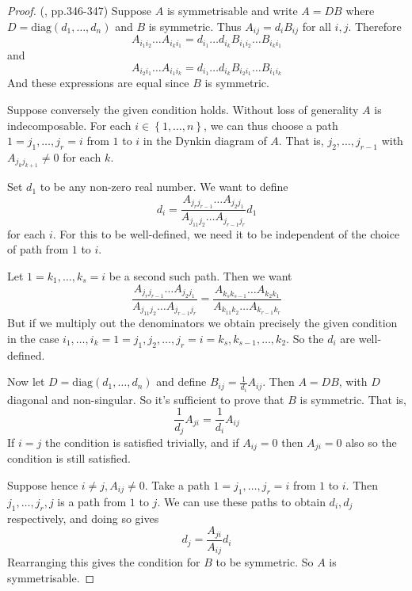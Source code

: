 \documentclass[11pt,a4paper]{report}
\theoremstyle{definition}
\begin{document}
\begin{proof} (\cite{Carter}, pp.346-347) Suppose $A$ is symmetrisable and write $A = DB$ where $D = \text{diag}(d_1, \ldots, d_n)$ and $B$ is symmetric. Thus $A_{ij} = d_i B_{ij}$ for all $i, j$. Therefore \begin{equation*}A_{i_1 i_2} \ldots A_{i_k i_1} = d_{i_1} \ldots d_{i_k} B_{i_1 i_2}  \ldots B_{i_k i_1}\end{equation*} and \begin{equation*}A_{i_2 i_1} \ldots A_{i_1 i_k} = d_{i_1} \ldots d_{i_k} B_{i_2 i_1} \ldots B_{i_1 i_k}\end{equation*} And these expressions are equal since $B$ is symmetric.

Suppose conversely the given condition holds. Without loss of generality $A$ is indecomposable. For each $i \in \left\{1, \ldots, n\right\}$, we can thus choose a path $1 = j_1, \ldots, j_r = i$ from $1$ to $i$ in the Dynkin diagram of $A$. That is, $j_2, \ldots, j_{r-1}$ with $A_{j_k j_{k+1}} \neq 0$ for each $k$. 

Set $d_1$ to be any non-zero real number. We want to define \begin{equation*}d_i = \dfrac{A_{j_r j_{r-1}}\ldots A_{j_2 j_1}}{A_{j_11j_2} \ldots A_{j_{r-1} j_r}} d_1\end{equation*} for each $i$. For this to be well-defined, we need it to be independent of the choice of path from $1$ to $i$. 

Let $1 = k_1, \ldots, k_s = i$ be a second such path. Then we want \begin{equation*}\dfrac{A_{j_r j_{r-1}}\ldots A_{j_2 j_1}}{A_{j_11j_2} \ldots A_{j_{r-1} j_r}} = \dfrac{A_{k_s k_{s-1}}\ldots A_{k_2 k_1}}{A_{k_11k_2} \ldots A_{k_{r-1} k_r}}\end{equation*} But if we multiply out the denominators we obtain precisely the given condition in the case $i_1, \ldots, i_k = 1= j_1, j_2, \ldots, j_r = i = k_s, k_{s-1}, \ldots, k_2$. So the $d_i$ are well-defined.

Now let $D = \text{diag}(d_1, \ldots, d_n)$ and define $B_{ij} = \frac{1}{d_i} A_{ij}$. Then $A = DB$, with $D$ diagonal and non-singular. So it's sufficient to prove that $B$ is symmetric. That is, \begin{equation*}\dfrac{1}{d_j} A_{ji} = \dfrac{1}{d_i} A_{ij}\end{equation*} If $i = j$ the condition is satisfied trivially, and if $A_{ij} = 0$ then $A_{ji} = 0$ also so the condition is still satisfied. 

Suppose hence $i \neq j, A_{ij} \neq 0$. Take a path $1 = j_1, \ldots, j_r = i$ from $1$ to $i$. Then $j_1, \ldots, j_r, j$ is a path from $1$ to $j$. We can use these paths to obtain $d_i, d_j$ respectively, and doing so gives \begin{equation*}d_j = \frac{A_{ji}}{A_{ij}} d_i\end{equation*} Rearranging this gives the condition for $B$ to be symmetric. So $A$ is symmetrisable. \end{proof}
\end{document}
